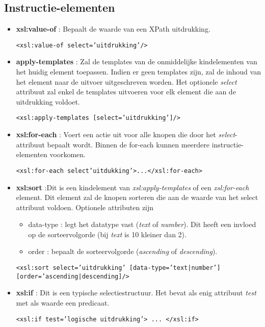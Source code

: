\documentclass{report}
\begin{document}
	\subsection{Instructie-elementen}
	\begin{itemize}
		\item \textbf{xsl:value-of} : Bepaalt de waarde van een XPath uitdrukking.
		
			  \texttt{<xsl:value-of select='uitdrukking'/>}
			  
		\item \textbf{apply-templates} : Zal de templates van de onmiddelijke kindelementen van het huidig element toepassen. Indien er geen templates zijn, zal de inhoud van het element naar de uitvoer uitgeschreven worden. Het optionele \textit{select} attribuut zal enkel de templates uitvoeren voor elk element die aan de uitdrukking voldoet.
		
			  \texttt{<xsl:apply-templates [select='uitdrukking']/>}
			  
		\item \textbf{xsl:for-each} : Voert een actie uit voor alle knopen die door het \textit{select}-attribuut bepaalt wordt. Binnen de for-each kunnen meerdere instructie-elementen voorkomen.
		
			  \texttt{<xsl:for-each select'uitdukking'>...</xsl:for-each>}
			  
		\item \textbf{xsl:sort} :Dit is een kindelement van \textit{xsl:apply-templates} of een \textit{xsl:for-each} element. Dit element zal de knopen sorteren die aan de waarde van het select attribuut voldoen. Optionele attributen zijn
			\begin{itemize}
				\item data-type : legt het datatype vast (\textit{text} of \textit{number}). Dit heeft een invloed op de sorteervolgorde (bij \textit{text} is 10 kleiner dan 2).
				\item order : bepaalt de sorteervolgorde (\textit{ascending} of \textit{descending}).
			\end{itemize}
				
				\texttt{<xsl:sort select='uitdrukking' [data-type='text|number'] [order='ascending|descending]/>}
		
		\item \textbf{xsl:if} : Dit is een typische selectiestructuur. Het bevat als enig attribuut \textit{test} met als waarde een predicaat.
		
			  \texttt{<xsl:if test='logische uitdrukking'> ... </xsl:if>}
			  

\end{itemize}
\end{document}
